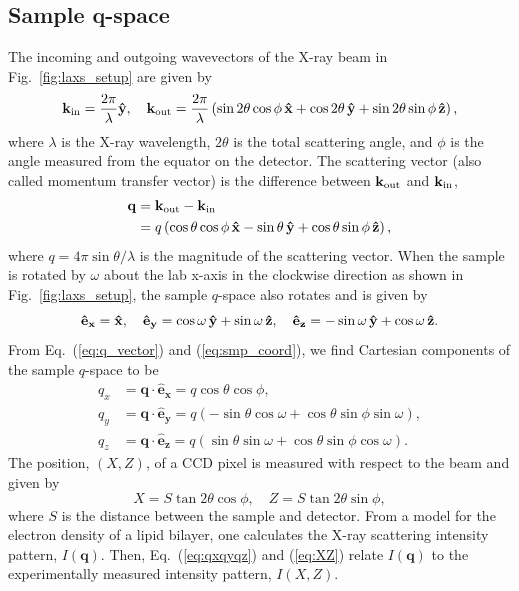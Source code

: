 \subsection{Sample q-space}\label{sec:sample_q-space}
The incoming and outgoing wavevectors of the X-ray beam in Fig.~\ref{fig:laxs_setup}
are given by
\begin{equation}
  \mathbf{k}_{\mathrm{in}} = \frac{2\pi}{\lambda} \mathbf{\hat{y}}, \quad
  \mathbf{k}_{\mathrm{out}} = 
    \frac{2\pi}{\lambda} \left( 
      \sin 2\theta \cos\phi \, \mathbf{\hat{x}}
      + \cos 2\theta \, \mathbf{\hat{y}}
      + \sin 2\theta \sin\phi \, \mathbf{\hat{z}} 
    \right),
\end{equation}
where $\lambda$ is the X-ray wavelength, $2\theta$ is the total scattering
angle, and $\phi$ is the angle measured from the equator on the detector. 
The scattering vector (also called
momentum transfer vector) is
the difference between $\mathbf{k}_{\mathrm{out}}$ and $\mathbf{k}_{\mathrm{in}}$,
\begin{align}
  \mathbf{q} &= \mathbf{k}_{\mathrm{out}} - \mathbf{k}_{\mathrm{in}} \nonumber \\
             &= q \left( 
                  \cos\theta\cos\phi \, \mathbf{\hat{x}} - \sin\theta \, \mathbf{\hat{y}}
                  + \cos\theta\sin\phi \, \mathbf{\hat{z}}
                \right),
  \label{eq:q_vector}
\end{align}
where $q=4\pi\sin\theta/\lambda$ is the magnitude of the scattering vector. 
When the sample is rotated by $\omega$ about the lab x-axis in the clockwise 
direction as shown in Fig.~\ref{fig:laxs_setup}, the sample $q$-space also 
rotates and 
is given by  
\begin{equation}
  \mathbf{\hat{e}_x} = \mathbf{\hat{x}}, \quad
  \mathbf{\hat{e}_y} = \cos\omega\,\mathbf{\hat{y}} + \sin\omega\,\mathbf{\hat{z}}, \quad
  \mathbf{\hat{e}_z} = -\sin\omega\,\mathbf{\hat{y}} + \cos\omega\,\mathbf{\hat{z}}.
  \label{eq:smp_coord}
\end{equation}
From Eq.~(\ref{eq:q_vector}) and (\ref{eq:smp_coord}), we find Cartesian
components of the sample $q$-space to be
\begin{align}
  q_x &= \mathbf{q}\cdot\mathbf{\hat{e}_x} 
       = q\cos\theta\cos\phi, 
       \nonumber\\
  q_y &= \mathbf{q}\cdot\mathbf{\hat{e}_y} 
       = q\left(-\sin\theta\cos\omega + \cos\theta\sin\phi\sin\omega\right), 
       \nonumber\\
  q_z &= \mathbf{q}\cdot\mathbf{\hat{e}_z} 
       = q\left(\sin\theta\sin\omega + \cos\theta\sin\phi\cos\omega\right).
       \label{eq:qxqyqz}
\end{align}
The position, $(X,Z)$, of a CCD pixel is measured with respect to the beam 
and given by
\begin{equation}
  X = S \tan 2\theta \cos\phi, \quad Z = S \tan 2\theta \sin\phi,
  \label{eq:XZ}
\end{equation} 
where $S$ is the distance between the sample and detector.
From a model for the electron density of a lipid bilayer, one calculates
the X-ray scattering intensity pattern, $I(\mathbf{q})$. Then, Eq.~(\ref{eq:qxqyqz})
and (\ref{eq:XZ}) relate $I(\mathbf{q})$ to the experimentally measured
intensity pattern, $I(X,Z)$. 

